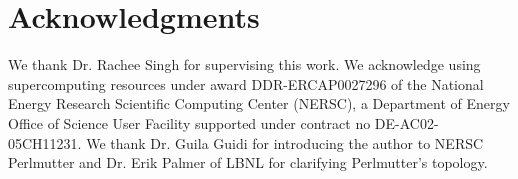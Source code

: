 
\section{Acknowledgments}\label{sec:acknowledgments}
We thank Dr. Rachee Singh for supervising this work.
We acknowledge using supercomputing resources under award DDR-ERCAP0027296 of the National Energy Research
Scientific Computing Center (NERSC), a Department of Energy Office of Science User Facility
supported under contract no DE-AC02-05CH11231.
We thank Dr. Guila Guidi for introducing the author to NERSC Perlmutter and
Dr. Erik Palmer of LBNL for clarifying Perlmutter's topology.